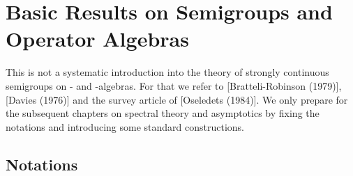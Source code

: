 
\chapter{Basic Results on Semigroups and Operator Algebras}\label{chap:D-I}

This is not a systematic introduction into the theory of strongly continuous semigroups on \CA- and \WA-algebras.
For that we refer to [Bratteli-Robinson (1979)], [Davies (1976)] and the survey article of [Oseledets (1984)].
We only prepare for the subsequent chapters on spectral theory and asymptotics by fixing the notations and introducing some standard constructions.

\section{Notations}\label{sec:notations}

